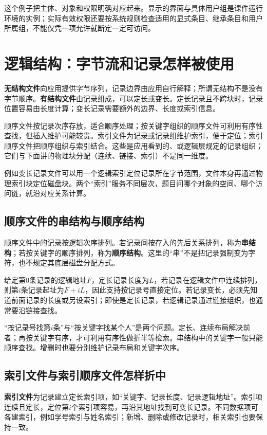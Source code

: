 这个例子把主体、对象和权限明确对应起来。显示的界面与具体用户组是课件运行环境的实例；实际有效权限还要按系统规则检查适用的显式条目、继承条目和用户所属组，不能仅凭一项允许就断定一定可访问。

\section{逻辑结构：字节流和记录怎样被使用}\label{OS04-6-4}

\textbf{无结构文件}向应用提供字节序列，记录边界由应用自行解释；所谓无结构不是没有字节顺序。\textbf{有结构文件}由记录组成，可以定长或变长。定长记录且不跨块时，记录位置容易由长度计算；变长记录需要额外的边界、长度或索引信息。

顺序文件按记录次序存放，适合顺序处理；按关键字组织的顺序文件可利用有序性查找，但插入维护可能较贵。索引文件为记录或记录组维护索引，便于定位；索引顺序文件把顺序组织与索引结合。这些是应用看到的、或逻辑层规定的记录组织；它们与下面讲的物理块分配（连续、链接、索引）不是同一维度。

例如变长记录文件可以用一个逻辑索引定位记录所在字节范围，文件本身再通过物理索引块定位磁盘块。两个``索引''服务不同层次，题目问哪个对象的空间、哪个访问链，就沿对应关系计算。

\subsection{顺序文件的串结构与顺序结构}\label{OS04-sequential-records}

顺序文件中的记录按逻辑次序排列。若记录间按存入的先后关系排列，称为\textbf{串结构}；若按关键字的顺序排列，称为\textbf{顺序结构}。这里的``串''不是把记录强制变为字符，也不规定其底层磁盘分配方式。

给定第0条记录的逻辑地址\(F\)，定长记录长度为\(L\)，若记录在逻辑文件中连续排列，则第\(i\)条记录起址为\(F+iL\)，因此支持按记录号直接定位。若记录变长，必须先知道前面记录的长度或另设索引；即使是定长记录，若逻辑记录通过链接组织，也通常要沿链接查找。

``按记录号找第\(i\)条''与``按关键字找某个人''是两个问题。定长、连续布局解决前者；再按关键字有序，才可利用有序性做折半等检索。串结构中的关键字一般只能顺序查找。增删时也要分别维护记录布局和关键字次序。

\subsection{索引文件与索引顺序文件怎样折中}\label{OS04-record-index}

\textbf{索引文件}为记录建立定长索引项，如``关键字、记录长度、记录逻辑地址''。索引项连续且定长，定位第\(i\)个索引项容易，再沿其地址找到可变长记录。不同数据项可各建索引，例如学号索引与姓名索引；新增、删除或修改记录时，相关索引也要保持一致。


